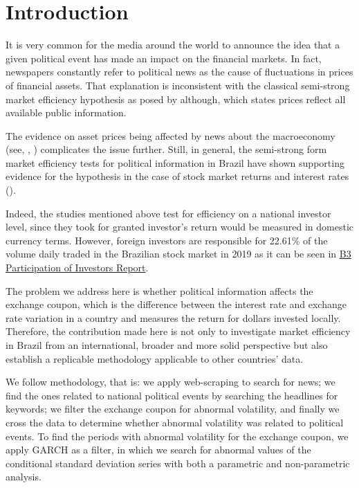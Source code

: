 \documentclass[cic,tc, english]{iiufrgs}
\begin{document}
\tableofcontents


\chapter{Introduction} \label{chapter_introduction}

    It is very common for the media around the world to announce the idea that a given political event has made an impact on the financial markets. In fact, newspapers constantly refer to political news as the cause of fluctuations in prices of financial assets. That explanation is inconsistent with the classical semi-strong market efficiency hypothesis as posed by \citet{fama1970} although, which states prices reflect all available public information.  
    
    The evidence on asset prices being affected by news about the macroeconomy (see, \citet{macqueenroley1993}, \citet{caporaleetal2015}) complicates the issue further. Still, in general, the semi-strong form market efficiency tests for political information in Brazil have shown supporting evidence for the hypothesis in the case of stock market returns and interest rates (\citet{marquessantos2016}).
    
    Indeed, the studies mentioned above test for efficiency on a national investor level, since they took for granted investor's return would be measured in domestic currency terms.  However, foreign investors are responsible for 22.61\% of the volume daily traded in the Brazilian stock market in 2019 as it can be seen in  \href{http://www.b3.com.br/data/files/14/B4/D5/25/4B80B61070D79EA6AC094EA8/partdir_NOVOv2.xls}{B3 Participation of Investors Report}.
    
    The problem we address here is whether political information affects the exchange coupon, which is the difference between the interest rate and exchange rate variation in a country and measures the return for dollars invested locally. Therefore, the contribution made here is not only to investigate market efficiency in Brazil from an international, broader and more solid perspective but also establish a replicable methodology applicable to other countries' data.
    
    We follow \citet{marquessantos2016} methodology, that is: we apply web-scraping to search for news; we find the ones related to national political events by searching the headlines for keywords; we filter the exchange coupon for abnormal volatility, and finally we cross the data to determine whether abnormal volatility was related to political events. To find the periods with abnormal volatility for the exchange coupon, we apply \citet{bollerslev1986} GARCH as a filter, in which we search for abnormal values of the conditional standard deviation series with both a parametric and non-parametric analysis.
\end{document}
